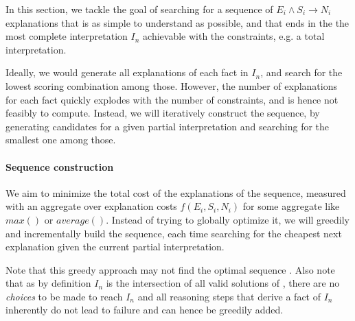 In this section, we tackle the goal of searching for a sequence of $E_i \wedge S_i \rightarrow N_i$ explanations that is as simple to understand as possible, and that ends in the the most complete interpretation $I_n$ achievable with the constraints, e.g. a total interpretation.

Ideally, we would generate all explanations of each fact in $I_n$, and search for the lowest scoring combination among those. However, the number of explanations for each fact quickly explodes with the number of constraints, and is hence not feasibly to compute. Instead, we will iteratively construct the sequence, by generating candidates for a given partial interpretation and searching for the smallest one among those.


\paragraph{Sequence construction}
We aim to minimize the total cost of the explanations of the sequence, measured with an aggregate over explanation costs $f(E_i, S_i, N_i)$ for some aggregate like $max()$ or $average()$. Instead of trying to globally optimize it, we will greedily and incrementally build the sequence, each time searching for the cheapest next explanation given the current partial interpretation. 


Note that this greedy approach may not find the optimal sequence . Also note that as by definition $I_n$ is the intersection of all valid solutions of \allconstraints, there are no \textit{choices} to be made to reach $I_n$ and all reasoning steps that derive a fact of $I_n$ inherently do not lead to failure and can hence be greedily added. 


